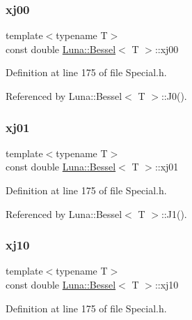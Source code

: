 \mbox{\label{structLuna_1_1Bessel_a69e31bcef81cee0b64a40efd2c6195ac}} 
\subsubsection{\texorpdfstring{xj00}{xj00}}
{\footnotesize\ttfamily template$<$typename T$>$ \\
const double \hyperlink{structLuna_1_1Bessel}{Luna\+::\+Bessel}$<$ T $>$\+::xj00}



Definition at line 175 of file Special.\+h.



Referenced by Luna\+::\+Bessel$<$ T $>$\+::\+J0().

\mbox{\label{structLuna_1_1Bessel_a9423de154e56c25f2615deaa699e1ad2}} 
\subsubsection{\texorpdfstring{xj01}{xj01}}
{\footnotesize\ttfamily template$<$typename T$>$ \\
const double \hyperlink{structLuna_1_1Bessel}{Luna\+::\+Bessel}$<$ T $>$\+::xj01}



Definition at line 175 of file Special.\+h.



Referenced by Luna\+::\+Bessel$<$ T $>$\+::\+J1().

\mbox{\label{structLuna_1_1Bessel_a40044c24955f5e771fd8cbef9fd06397}} 
\subsubsection{\texorpdfstring{xj10}{xj10}}
{\footnotesize\ttfamily template$<$typename T$>$ \\
const double \hyperlink{structLuna_1_1Bessel}{Luna\+::\+Bessel}$<$ T $>$\+::xj10}



Definition at line 175 of file Special.\+h.

